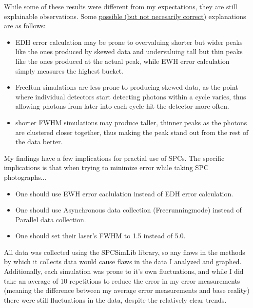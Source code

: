 \documentclass{beamer}
\begin{document}
\begin{frame}
  While some of these results were different from my expectations, they are still explainable observations. Some \underline{possible (but not necesarily correct)} explanations are as follows:
  \begin{itemize}
  \item EDH error calculation may be prone to overvaluing shorter but wider peaks like the ones produced by skewed data and undervaluing tall but thin peaks like the ones produced at the actual peak, while EWH error calculation simply measures the highest bucket.
  \item FreeRun simulations are less prone to producing skewed data, as the point where individual detectors start detecting photons within a cycle varies, thus allowing photons from later into each cycle hit the detector more often.
  \item shorter FWHM simulations may produce taller, thinner peaks as the photons are clustered closer together, thus making the peak stand out from the rest of the data better.
  \end{itemize}
\end{frame}

\begin{frame}
  My findings have a few implications for practial use of SPCs. The specific implications is that when trying to minimize error while taking SPC photographs...
  \begin{itemize}
  \item One should use EWH error caclulation instead of EDH error calculation.
  \item One should use Asynchronous data collection (Freerunningmode) instead of Parallel data collection.
  \item One should set their laser's FWHM to 1.5 instead of 5.0.
  \end{itemize}
\end{frame}

\begin{frame}
\end{frame}

\begin{frame}
  All data was collected using the SPCSimLib library, so any flaws in the methods by which it collects data would cause flaws in the data I analyzed and graphed. Additionally, each simulation was prone to it's own fluctuations, and while I did take an average of 10 repetitions to reduce the error in my error measurements (meaning the difference between my average error measurements and base reality) there were still fluctuations in the data, despite the relatively clear trends.
\end{frame}
\end{document}
